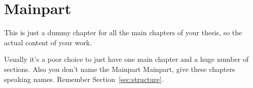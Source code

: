 
\chapter{Mainpart}
	This is just a dummy chapter for all the main chapters of your thesis, so the actual content of your work.
	
	Usually it's a poor choice to just have one main chapter and a huge number of sections.
	Also you don't name the Mainpart Mainpart, give these chapters speaking names.
	Remember Section~\ref{sec:structure}.
	